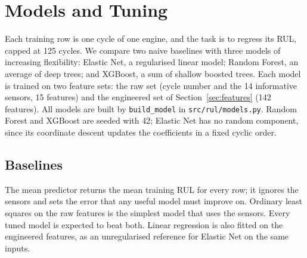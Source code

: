 \section{Models and Tuning}
\label{sec:models}

Each training row is one cycle of one engine, and the task is to regress
its RUL, capped at 125 cycles. We compare two naive baselines with three
models of increasing flexibility: Elastic Net, a regularised linear model;
Random Forest, an average of deep trees; and XGBoost, a sum of shallow
boosted trees. Each model is trained on two feature sets: the raw set
(cycle number and the 14 informative sensors, 15 features) and the
engineered set of Section~\ref{sec:features} (142 features). All models are
built by \texttt{build\_model} in \texttt{src/rul/models.py}. Random
Forest and XGBoost are seeded with 42; Elastic Net has no random component,
since its coordinate descent updates the coefficients in a fixed cyclic
order.

\subsection{Baselines}
The mean predictor returns the mean training RUL for every row; it ignores
the sensors and sets the error that any useful model must improve on.
Ordinary least squares on the raw features is the simplest model that uses
the sensors. Every tuned model is expected to beat both. Linear regression
is also fitted on the engineered features, as an unregularised reference
for Elastic Net on the same inputs.

